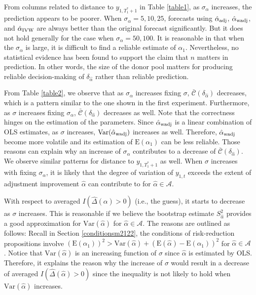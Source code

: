 \documentclass[11pt,3p,review,authoryear]{elsarticle}
\def\mc#1{\mathcal{#1}} %
\def\E#1{\mathrm{E}(#1)} %
\def\var#1{\mathrm{Var}(#1)} %
\theoremstyle{definition}
\begin{document}
From columns related to distance to $y_{1, T_1^*+1}$ in Table \ref{table1}, as $\sigma_{\alpha}$ increases, the prediction appears to be poorer. When $\sigma_{\alpha}= 5, 10, 25$, forecasts using $\hat{\alpha}_{\rm adj}$, $\hat{\alpha}_{\rm wadj}$, and $\hat{\alpha}_{\rm IVW}$ are always better than the original forecast significantly. But it does not hold generally for the case when $\sigma_{\alpha}=50, 100$. It is reasonable in that when the $\sigma_{\alpha}$ is large, it is difficult to find a reliable estimate of $\alpha_1$.  Nevertheless, no statistical evidence has been found to support the claim that $n$ matters in prediction. In other words, the size of the donor pool matters for producing reliable decision-making of $\delta_{\hat{\alpha}}$ rather than reliable prediction. 






From Table \ref{table2}, we observe that as $\sigma_{\alpha}$ increases fixing $\sigma$, $\bar{\mc{C}}(\delta_{\hat{\alpha}})$   decreases, which is a pattern similar to the one shown in the first experiment. Furthermore, as $\sigma$ increases fixing $\sigma_{\alpha}$, $\bar{\mc{C}}(\delta_{\hat{\alpha}})$ decreases as well. Note that the correctness  hinges on the estimation of the parameters. Since $\hat{\alpha}_{\rm wadj}$  is a linear combination of OLS estimates, as $\sigma$ increases, $\var{\hat{\alpha}_{\rm wadj}}$ increases as well. Therefore, $\hat{\alpha}_{\rm wadj}$ become more volatile and its estimation of $\E{\alpha_1}$ can be less reliable. Those reasons can explain  why an increase of $\sigma_{\alpha}$ contributes to a decrease of  $\bar{\mc{C}}(\delta_{\hat{\alpha}})$.  We observe similar patterns for distance to $y_{1, T_1^*+1}$ as well. When $\sigma$ increases with fixing $\sigma_{\alpha}$, it is likely that the degree of variation of $y_{1,t}$ exceeds the extent of adjustment improvement $\hat{\alpha}$ can contribute to for $\hat{\alpha}\in \mc{A}$.




With respect to averaged $I(\hat{\Delta}(\hat{\alpha})>0)$ (i.e., the guess), it starts to decrease as $\sigma$ increases. This is reasonable if we believe the bootstrap estimate $S^2_{\hat{\alpha}}$ provides a good approximation for $\var{\hat{\alpha}}$ for $\hat{\alpha}\in \mc{A}$. The reasons are outlined as follows: Recall in Section \ref{conditionsm2122}, the conditions of risk-reduction propositions involve $(\E{\alpha_1})^2 > \var{\hat{\alpha}} + (\E{\hat{\alpha}}-\E{\alpha_1})^2$ for $\hat{\alpha}\in \mc{A}$. Notice that $\var{\hat{\alpha}}$ is an increasing function of $\sigma$ since $\hat{\alpha}$ is estimated by OLS. Therefore, it explains the reason why the increase of $\sigma$ would result in a decrease of averaged $I(\hat{\Delta}(\hat{\alpha})>0)$ since the inequality is not likely to hold when  $\var{\hat{\alpha}}$ increases.
\end{document}
